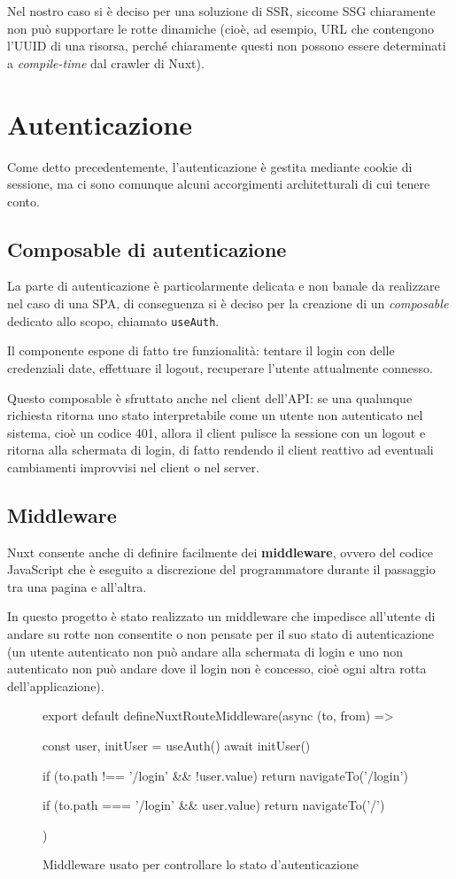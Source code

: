 Nel nostro caso si è deciso per una soluzione di SSR, siccome SSG chiaramente non può supportare le rotte dinamiche (cioè, ad esempio, URL che contengono l'UUID di una risorsa, perché chiaramente questi non possono essere determinati a \emph{compile-time} dal crawler di Nuxt).

\section{Autenticazione}
Come detto precedentemente, l'autenticazione è gestita mediante cookie di sessione, ma ci sono comunque alcuni accorgimenti architetturali di cui tenere conto.

\subsection{Composable di autenticazione}
La parte di autenticazione è particolarmente delicata e non banale da realizzare nel caso di una SPA, di conseguenza si è deciso per la creazione di un \emph{composable} dedicato allo scopo, chiamato \texttt{useAuth}.

Il componente espone di fatto tre funzionalità: tentare il login con delle credenziali date, effettuare il logout, recuperare l'utente attualmente connesso.

Questo composable è sfruttato anche nel client dell'API: se una qualunque richiesta ritorna uno stato interpretabile come un utente non autenticato nel sistema, cioè un codice 401, allora il client pulisce la sessione con un logout e ritorna alla schermata di login, di fatto rendendo il client reattivo ad eventuali cambiamenti improvvisi nel client o nel server.

\subsection{Middleware}
Nuxt consente anche di definire facilmente dei \textbf{middleware}, ovvero del codice JavaScript che è eseguito a discrezione del programmatore durante il passaggio tra una pagina e all'altra.

In questo progetto è stato realizzato un middleware che impedisce all'utente di andare su rotte non consentite o non pensate per il suo stato di autenticazione (un utente autenticato non può andare alla schermata di login e uno non autenticato non può andare dove il login non è concesso, cioè ogni altra rotta dell'applicazione).

\begin{figure}
  \centering
  \begin{jscode}
export default defineNuxtRouteMiddleware(async (to, from) => {
  const {user, initUser} = useAuth()
  await initUser()
    
  if (to.path !== '/login' && !user.value)
    return navigateTo('/login')
    
  if (to.path === '/login' && user.value)
    return navigateTo('/')
})
  \end{jscode}
  \caption{Middleware usato per controllare lo stato d'autenticazione}
\end{figure}

